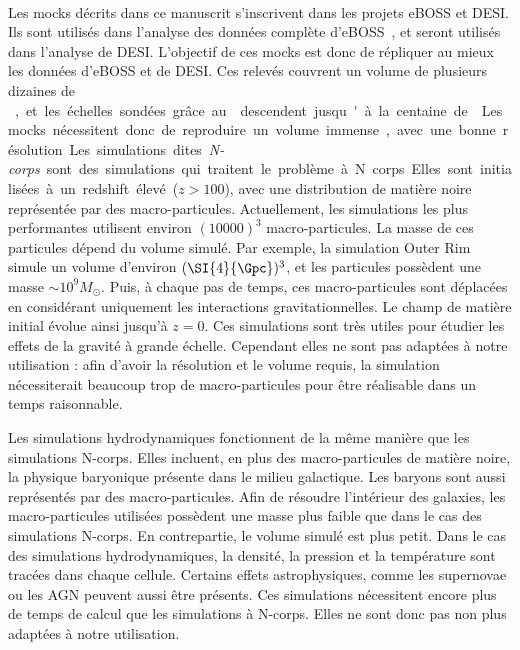 \paragraph{}
Les mocks décrits dans ce manuscrit s'inscrivent dans les projets eBOSS et DESI. Ils sont utilisés dans l'analyse \lya{} des données complète d'eBOSS~\autocite{DuMasdesBourboux2020}, et seront utilisés dans l'analyse \lya{} de DESI.
L'objectif de ces mocks est donc de répliquer au mieux les données \lya{} d'eBOSS et de DESI. Ces relevés couvrent un volume de plusieurs dizaines de \si{\cubic\Gpc}, et les échelles sondées grâce au \lya{} descendent jusqu'à la centaine de \si{\kpc}. Les mocks nécessitent donc de reproduire un volume immense, avec une bonne résolution.
Les simulations dites \emph{N-corps} sont des simulations qui traitent le problème à N corps.
Elles sont initialisées à un redshift élevé ($z > \num{100}$), avec une distribution de matière noire représentée par des macro-particules.
Actuellement, les simulations les plus performantes utilisent environ $(\num{10000})^3$ macro-particules.
La masse de ces particules dépend du volume simulé. Par exemple, la simulation Outer Rim~\autocite{Heitmann2019} simule un volume d'environ $(\SI{4}{\Gpc})^3$, et les particules possèdent une masse $\sim 10^{9} M_{\odot}$.
Puis, à chaque pas de temps, ces macro-particules sont déplacées en considérant uniquement les interactions gravitationnelles. Le champ de matière initial évolue ainsi jusqu'à $z=0$. Ces simulations sont très utiles pour étudier les effets de la gravité à grande échelle. Cependant elles ne sont pas adaptées à notre utilisation : afin d'avoir la résolution et le volume requis, la simulation nécessiterait beaucoup trop de macro-particules pour être réalisable dans un temps raisonnable.

Les simulations hydrodynamiques fonctionnent de la même manière que les simulations N-corps. Elles incluent, en plus des macro-particules de matière noire, la physique baryonique présente dans le milieu galactique. Les baryons sont aussi représentés par des macro-particules. Afin de résoudre l'intérieur des galaxies, les macro-particules utilisées possèdent une masse plus faible que dans le cas des simulations N-corps. En contrepartie, le volume simulé est plus petit. Dans le cas des simulations hydrodynamiques, la densité, la pression et la température sont tracées dans chaque cellule. Certains effets astrophysiques, comme les supernovae ou les AGN peuvent aussi être présents. 
Ces simulations nécessitent encore plus de temps de calcul que les simulations à N-corps. Elles ne sont donc pas non plus adaptées à notre utilisation.

